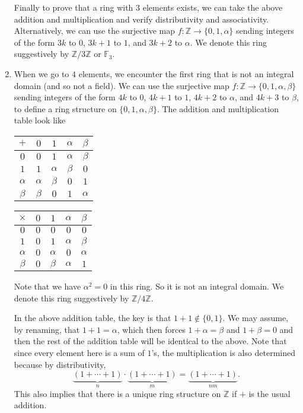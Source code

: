 \documentclass{article}
\def\Z{{\mathbb Z}}
\def\F{{\mathbb F}}
\def\Z{{\mathbb Z}}
\def\F{{\mathbb F}}
\begin{document}
\begin{enumerate}
    Finally to prove that a ring with 3 elements exists, we can take the above addition and multiplication and verify distributivity and associativity. Alternatively, we can use the surjective map $f:\Z\rightarrow \{0,1,\alpha\}$ sending integers of the form $3k$ to $0$, $3k+1$ to $1$, and $3k+2$ to $\alpha$. We denote this ring suggestively by $\Z/3\Z$ or $\F_3$.


    \item When we go to $4$ elements, we encounter the first ring that is not an integral domain (and so not a field). We can use the surjective map $f:\Z\rightarrow \{0,1,\alpha,\beta\}$ sending integers of the form $4k$ to $0$, $4k+1$ to $1$, $4k+2$ to $\alpha$, and $4k+3$ to $\beta$, to define a ring structure on $\{0,1,\alpha,\beta\}$. The addition and multiplication table look like
    \begin{center}
    \begin{tabular}{c|c|c|c|c}
             $+$&$0$&$1$&$\alpha$&$\beta$  \\ \hline
             $0$&$0$&$1$&$\alpha$&$\beta$  \\ \hline
             $1$&$1$&$\alpha$&$\beta$&$0$  \\ \hline
             $\alpha$&$\alpha$&$\beta$&$0$&$1$   \\ \hline
             $\beta$&$\beta$&$0$&$1$&$\alpha$
    \end{tabular}
    \hspace{50pt}
    \begin{tabular}{c|c|c|c|c}
             $\times$&$0$&$1$&$\alpha$&$\beta$   \\ \hline
             $0$&$0$&$0$&$0$&$0$  \\ \hline
             $1$&$0$&$1$&$\alpha$&$\beta$   \\ \hline
             $\alpha$&$0$&$\alpha$&$0$&$\alpha$  \\ \hline
             $\beta$&$0$&$\beta$&$\alpha$&$1$
    \end{tabular}
    \end{center}
    Note that we have $\alpha^2 = 0$ in this ring. So it is not an integral domain. We denote this ring suggestively by $\Z/4\Z$.
    
    In the above addition table, the key is that $1 + 1 \notin \{0,1\}$. We may assume, by renaming, that $1 + 1 = \alpha$, which then forces $1+\alpha = \beta$ and $1 + \beta = 0$ and then the rest of the addition table will be identical to the above. Note that since every element here is a sum of $1$'s, the multiplication is also determined because by distributivity,
    $$\underbrace{(1+\cdots+1)}_{n}\cdot \underbrace{(1+\cdots+1)}_{m} = \underbrace{(1+\cdots+1)}_{nm}.$$ 
    This also implies that there is a unique ring structure on $\Z$ if $+$ is the usual addition.


\end{enumerate}
\end{document}
